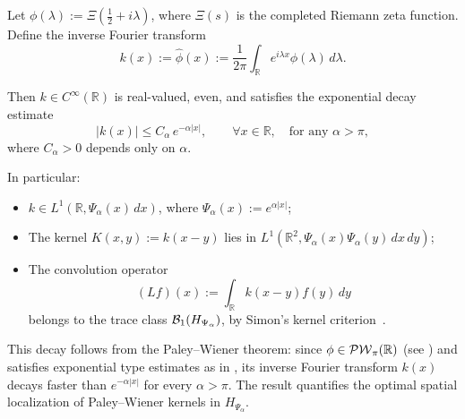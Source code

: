 \begin{lemma}
\label{lem:decay_inverse_fourier_xi}
Let \( \phi(\lambda) := \Xi\left( \tfrac{1}{2} + i\lambda \right) \), where \( \Xi(s) \) is the completed Riemann zeta function. Define the inverse Fourier transform
\[
k(x) := \widehat{\phi}(x) := \frac{1}{2\pi} \int_{\mathbb{R}} e^{i\lambda x} \phi(\lambda)\, d\lambda.
\]

Then \( k \in C^\infty(\mathbb{R}) \) is real-valued, even, and satisfies the exponential decay estimate
\[
|k(x)| \le C_\alpha\, e^{-\alpha |x|}, \qquad \forall x \in \mathbb{R}, \quad \text{for any } \alpha > \pi,
\]
where \( C_\alpha > 0 \) depends only on \( \alpha \).

\medskip
\noindent In particular:
\begin{itemize}
  \item \( k \in L^1(\mathbb{R}, \Psi_\alpha(x)\, dx) \), where \( \Psi_\alpha(x) := e^{\alpha |x|} \);
  \item The kernel \( K(x,y) := k(x - y) \) lies in \( L^1(\mathbb{R}^2, \Psi_\alpha(x)\Psi_\alpha(y)\, dx\, dy) \);
  \item The convolution operator
  \[
  (L f)(x) := \int_{\mathbb{R}} k(x - y) f(y)\, dy
  \]
  belongs to the trace class \( \mathcal{B}_1(H_{\Psi_\alpha}) \), by Simon’s kernel criterion~\cite[Thm.~4.2]{Simon2005TraceIdeals}.
\end{itemize}

\medskip
\noindent
This decay follows from the Paley--Wiener theorem: since \( \phi \in \mathcal{PW}_{\pi}(\mathbb{R}) \) (see ) and satisfies exponential type estimates as in , its inverse Fourier transform \( k(x) \) decays faster than \( e^{-\alpha |x|} \) for every \( \alpha > \pi \). The result quantifies the optimal spatial localization of Paley--Wiener kernels in \( H_{\Psi_\alpha} \).
\end{lemma}
